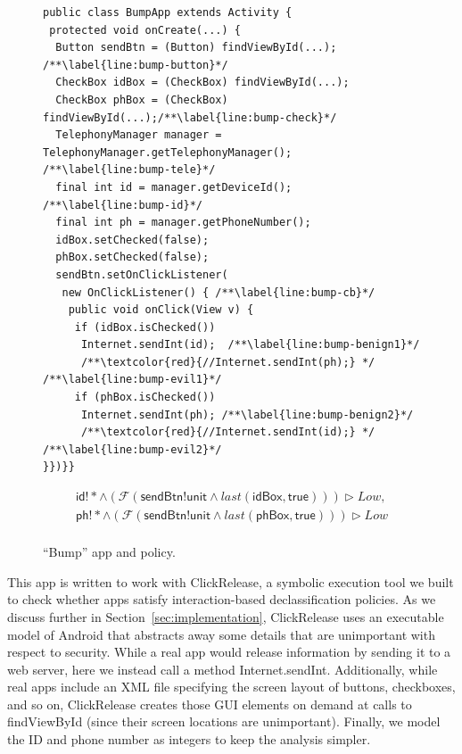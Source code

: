 \documentclass{llncs}
\newcommand{\code}[1]{\textsf{#1}} %
\newcommand{\toolname}{ClickRelease\xspace}
\newcommand{\tfuture}{\mathcal{F}}
\newcommand{\tlast}[2]{\textit{last}(#1, #2)}
\begin{document}
\begin{figure}[t]
\centering
  \begin{lstlisting}[name=Ex]
public class BumpApp extends Activity {
 protected void onCreate(...) {
  Button sendBtn = (Button) findViewById(...); /**\label{line:bump-button}*/
  CheckBox idBox = (CheckBox) findViewById(...);
  CheckBox phBox = (CheckBox) findViewById(...);/**\label{line:bump-check}*/
  TelephonyManager manager = TelephonyManager.getTelephonyManager(); /**\label{line:bump-tele}*/
  final int id = manager.getDeviceId(); /**\label{line:bump-id}*/
  final int ph = manager.getPhoneNumber();
  idBox.setChecked(false);
  phBox.setChecked(false);
  sendBtn.setOnClickListener(
   new OnClickListener() { /**\label{line:bump-cb}*/
    public void onClick(View v) {
     if (idBox.isChecked())
      Internet.sendInt(id);  /**\label{line:bump-benign1}*/      
      /**\textcolor{red}{//Internet.sendInt(ph);} */ /**\label{line:bump-evil1}*/
     if (phBox.isChecked())
      Internet.sendInt(ph); /**\label{line:bump-benign2}*/
      /**\textcolor{red}{//Internet.sendInt(id);} */ /**\label{line:bump-evil2}*/
}})}}
  \end{lstlisting}
\begin{displaymath}
  \begin{array}{cc}
      \code{id}!\ast \wedge (\tfuture ( \code{sendBtn!unit} \land
      \tlast{\code{idBox}}{\code{true}})) \rhd Low, \\

      \code{ph}!\ast \wedge (\tfuture (
      \code{sendBtn!unit} \land
      \tlast{\code{phBox}}{\code{true}})) \rhd Low \\
    \end{array}
\end{displaymath}
\caption{``Bump'' app and policy.}
\label{fig:app-bump}
\end{figure}
 
This app is written to work with \toolname{}, a symbolic execution tool we built to check
whether apps satisfy interaction-based declassification policies. As we
discuss further in Section~\ref{sec:implementation}, \toolname{} uses an
executable model of Android that abstracts away some details that are
unimportant with respect to security. While a real app would release
information by sending it to a web server, here we instead call a
method \code{Internet.sendInt}. Additionally, while real apps
include an XML file specifying the screen layout of buttons,
checkboxes, and so on, \toolname{} creates those GUI elements
on demand at calls to \code{findViewById} (since their screen locations are
unimportant). Finally, we model the ID and phone number as
integers to keep the analysis simpler.
\end{document}
